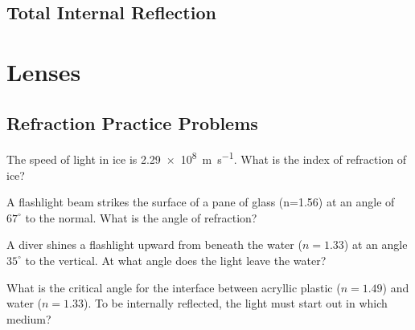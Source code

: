 \documentclass[10pt]{exam}
\begin{document}
\subsection*{Total Internal Reflection}

\vspace{5em}


\section*{Lenses}

\begin{center}


  \vs

\end{center}

\pagebreak


\subsection*{Refraction Practice Problems}

\begin{questions}
  \question 
    The speed of light in ice is \SI{2.29e8}{\meter\per\second}.  What is the index of refraction of ice?
    \vs

  \question
    A flashlight beam strikes the surface of a pane of glass (n=1.56) at an angle of $67^\circ$ to the normal.  What is the angle of refraction?
    \vs

  \question
    A diver shines a flashlight upward from beneath the water ($n=1.33$) at an angle $35^\circ$ to the vertical.  At what angle does the light leave the water?
    \vs

  \question
    What is the critical angle for the interface between acryllic plastic ($n=1.49$) and water ($n=1.33$).  To be internally reflected, the light must start out in which medium?
    \vs
 
\end{questions}
\end{document}
